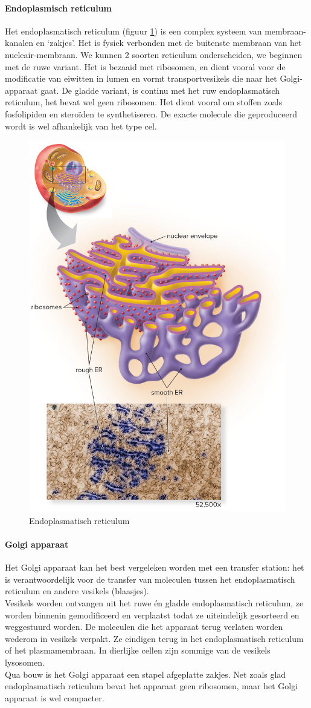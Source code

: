 \documentclass[a4paper,kul]{kulakarticle} %
\begin{document}
\paragraph{Endoplasmisch reticulum}
Het endoplasmatisch reticulum (figuur \ref{fig:endoplasmatisch-reticulum}) is een complex systeem van membraan-kanalen en `zakjes'. Het is fysiek verbonden met de buitenste membraan van het nucleair-membraan. We kunnen 2 soorten reticulum onderscheiden, we beginnen met de ruwe variant. Het is bezaaid met ribosomen, en dient vooral voor de modificatie van eiwitten in lumen en vormt transportvesikels die naar het Golgi-apparaat gaat. De gladde variant, is continu met het ruw endoplasmatisch reticulum, het bevat wel geen ribosomen.  Het dient vooral om stoffen zoals fosfolipiden en steroïden te synthetiseren. De exacte molecule die geproduceerd wordt is wel afhankelijk van het type cel.  
\begin{figure}[h]
	\centering
	\includegraphics[width=0.4\linewidth]{"Endoplasmatisch reticulum"}
	\caption[Endoplasmatisch reticulum]{Endoplasmatisch reticulum}
	\label{fig:endoplasmatisch-reticulum}
\end{figure}

\paragraph{Golgi apparaat}
Het Golgi apparaat kan het best vergeleken worden met een transfer station: het is verantwoordelijk voor de transfer van moleculen tussen het endoplasmatisch reticulum en andere vesikels (blaasjes). \\
Vesikels worden ontvangen uit het ruwe én gladde endoplasmatisch reticulum, ze worden binnenin gemodificeerd en verplaatst todat ze uiteindelijk gesorteerd en weggestuurd worden. De moleculen die het apparaat terug verlaten worden wederom in vesikels verpakt. Ze eindigen terug in het endoplasmatisch reticulum of het plasmamembraan. In dierlijke cellen zijn sommige van de vesikels lysosomen.  \\
Qua bouw is het Golgi apparaat een stapel afgeplatte zakjes. Net zoals glad endoplasmatisch reticulum bevat het apparaat geen ribosomen, maar het Golgi apparaat is wel compacter.
\end{document}
